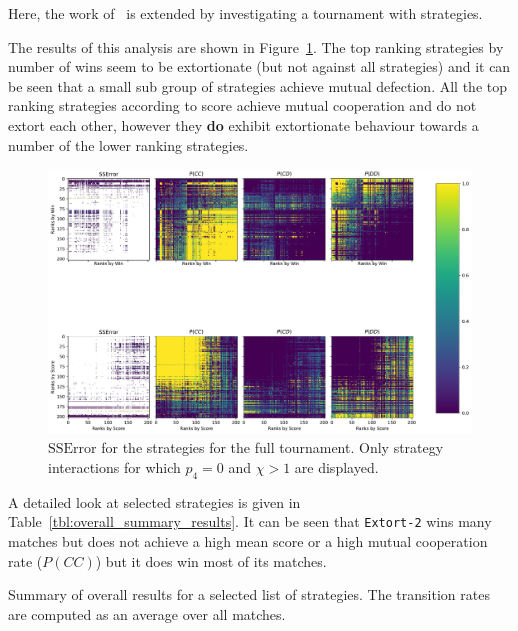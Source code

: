 \documentclass[a4paper]{article}
\begin{document}
Here, the work of~\cite{Stewart2012} is extended by investigating a tournament
with 
strategies.

The results of this analysis are shown in
Figure~\ref{fig:SSError_and_probabilities_in_full}. The top ranking strategies
by number of wins seem to be extortionate (but not against all strategies) and
it can be seen that a small sub group of strategies achieve mutual defection.
All the top ranking strategies according to score achieve mutual cooperation and
do not extort each other, however they
\textbf{do} exhibit extortionate behaviour towards a number of the lower ranking
strategies.

\begin{figure}[!htbp]
    \centering
    \includegraphics[width=.8\textwidth]{./assets/img/SSError_and_probabilities_in_full/main.pdf}
    \caption{\(\text{SSError}\) for the strategies for the full tournament. Only
    strategy interactions for which \(p_4=0\) and \(\chi>1\) are displayed.}
    \label{fig:SSError_and_probabilities_in_full}
\end{figure}

A detailed look at selected strategies is given in
Table~\ref{tbl:overall_summary_results}. It can be seen that \texttt{Extort-2}
wins many matches but does not achieve a high mean score or a high mutual
cooperation rate (\(P(CC)\)) but it does win most of its matches.

\begin{table}[!hbtp]
    \begin{center}
    \tiny
    
    \end{center}
    \caption{Summary of overall results for a selected list of strategies. The
    transition rates are computed as an average over all matches.}
    \label{tbl:overall_summary_results}
\end{table}
\end{document}

